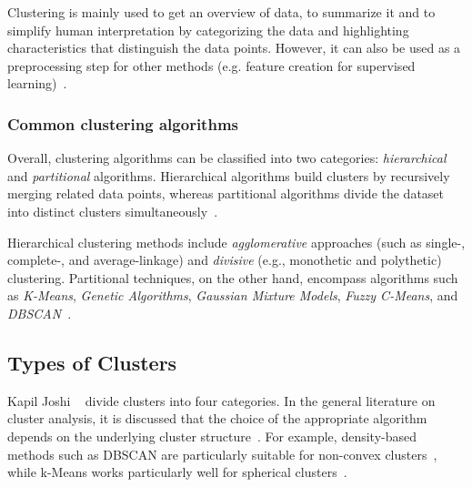 \documentclass[10pt,twocolumn,letterpaper]{article}
\begin{document}
Clustering is mainly used to get an overview of data, to summarize it and to
simplify human interpretation by categorizing the data and highlighting
characteristics that distinguish the data points. However, it can also be used
as a preprocessing step for other methods (e.g. feature creation for supervised
learning)~\cite{Jain2010651}.


\subsubsection{Common clustering algorithms}\label{subsubsec:common-clustering-algorithms}

Overall, clustering algorithms can be classified into two categories:
\textit{hierarchical} and \textit{partitional} algorithms. Hierarchical
algorithms build clusters by recursively merging related data points, whereas
partitional algorithms divide the dataset into distinct clusters
simultaneously~\cite{Ezugwu2022104743,Jain2010651}.

Hierarchical clustering methods include \textit{agglomerative} approaches (such
as single-, complete-, and average-linkage) and \textit{divisive} (e.g.,
monothetic and polythetic) clustering. Partitional techniques, on the other
hand, encompass algorithms such as \textit{K-Means}, \textit{Genetic
    Algorithms}, \textit{Gaussian Mixture Models}, \textit{Fuzzy C-Means}, and
\textit{DBSCAN}~\cite{Ezugwu2022104743}.


\subsection{Types of Clusters}\label{subsec:types-of-clusters}

Kapil Joshi \etal~\cite{Joshi2015} divide clusters into four categories. In the
general literature on cluster analysis, it is discussed that the choice of the
appropriate algorithm depends on the underlying cluster
structure~\cite{Ezugwu2022104743}. For example, density-based methods such as
DBSCAN are particularly suitable for non-convex clusters~\cite{Bhargav2016},
while k-Means works particularly well for spherical
clusters~\cite{Jain2010651}.

\theoremstyle{definition}
\newtheorem{definition}{Definition}[subsubsection]
\end{document}
